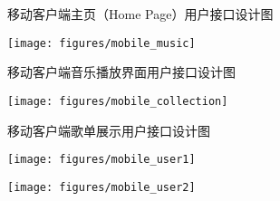 \begin{enumerate}
\begin{figure}[h!]
  \caption{  \label{fig:mobile_home}
  		移动客户端主页（Home Page）用户接口设计图
    }
\end{figure}

\begin{figure}[h!]
  \centering
 
  \texttt{[image: figures/mobile\_music]}

  \caption{ \label{fig:mobile_music}
  		移动客户端音乐播放界面用户接口设计图
    }
\end{figure}

\begin{figure}[h!]
  \centering

  \texttt{[image: figures/mobile\_collection]}

  \caption{  \label{fig:mobile_collection}
  		移动客户端歌单展示用户接口设计图
    }
\end{figure}


\begin{figure}[h!]
  \centering

  \texttt{[image: figures/mobile\_user1]}

  \caption{  \label{fig:mobile_user1}
    }
\end{figure}
\begin{figure}[h!]
  \centering

  \texttt{[image: figures/mobile\_user2]}


\end{figure}
\end{enumerate}
